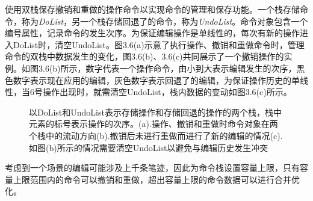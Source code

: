 使用双栈保存撤销和重做的操作命令以实现命令的管理和保存功能。一个栈存储命令，称为\textit{DoList}，另一个栈存储回退了的命令，称为\textit{UndoList}。命令对象包含一个编号属性，记录命令的发生次序。为保证编辑操作是单线性的，每次有新的操作进入DoList时，清空UndoList。图3.6(a)示意了执行操作、撤销和重做命令时，管理命令的双栈中数据发生的变化，图3.6(b)、3.6(c)共同展示了一个撤销操作的实例。如图3.6(b)所示，数字代表一个操作命令，由小到大表示编辑发生的次序，黑色数字表示现在应用的编辑，灰色数字表示回退了的编辑，为保证操作历史的单线性，当6号操作出现时，就需清空UndoList，栈内数据的变动如图3.6(c)所示。\begin{figure}[htbp]
    \centering

    \caption{以DoList和UndoList表示存储操作和存储回退的操作的两个栈，栈中元素的标号表示操作的次序。(a).操作、撤销和重做时命令对象在两个栈中的流动方向(b).撤销后未进行重做而进行了新的编辑的情况(c).如图(b)所示的情况需要清空UndoList以避免与编辑历史发生冲突}%
\end{figure}
考虑到一个场景的编辑可能涉及上千条笔迹，因此为命令栈设置容量上限，只有容量上限范围内的命令可以撤销和重做，超出容量上限的命令数据可以进行合并优化。
